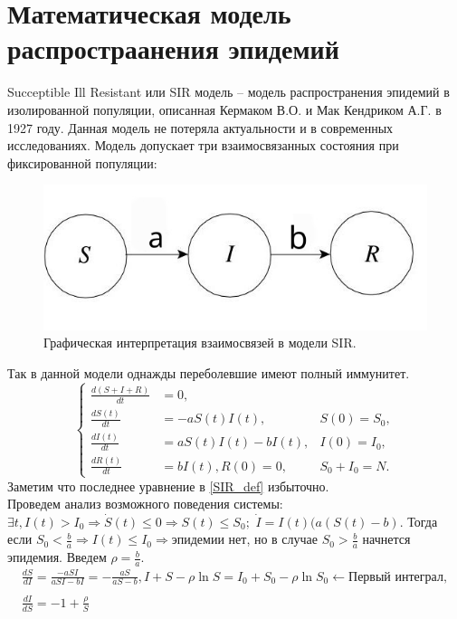 \section{Математическая модель распростраанения эпидемий}
Succeptible Ill Resistant или SIR модель -- модель распространения эпидемий в изолированной популяции, описанная Кермаком В.О. и Мак Кендриком А.Г. в 1927 году. Данная модель не потеряла актуальности и в современных исследованиях.
Модель допускает три взаимосвязанных состояния при фиксированной популяции: 
\begin{figure}[H]
	\begin{center}
		\includegraphics[width=0.7\linewidth]{ch11/SIR_model.jpg}
	\end{center}
	\caption{Графическая интерпретация взаимосвязей в модели SIR.}
\end{figure}
Так в данной модели однажды переболевшие имеют полный иммунитет.
\begin{equation}
	\left\lbrace 
	\begin{array}{lll}
		\frac{d(S+I+R)}{dt} &= 0,&\\
		\frac{dS(t)}{dt} &= -aS(t)I(t),& S(0)=S_0,\\
		\frac{dI(t)}{dt} &= aS(t)I(t)-bI(t),& I(0)=I_0,\\
		\frac{dR(t)}{dt} &= bI(t), R(0)=0,& S_0+I_0=N.
	\end{array}
	\right.
	\label{SIR_def}
\end{equation}
Заметим что последнее уравнение в \ref{SIR_def} избыточно. \\
Проведем анализ возможного поведения системы:
$\exists t, I(t)>I_0 \Rightarrow \dot{S}(t) \leqslant 0 \Rightarrow S(t) \leqslant S_0;$ $\dot{I} = I(t)(a(S(t) - b)$. Тогда если $S_0 < \frac{b}{a} \Rightarrow I(t) \leqslant I_0 \Rightarrow \text{эпидемии нет}$, но в случае $S_0 > \frac{b}{a}$ начнется эпидемия. Введем $\rho = \frac{b}{a}$.\\
\begin{equation*}
	\begin{array}{l}
	\frac{dS}{dI} = \frac{-aSI}{aSI-bI}=-\frac{aS}{aS-b}, I+S-\rho \ln{S}=I_0+S_0- \rho \ln{S_0} \leftarrow \text{Первый интеграл},\\
	\\
	\frac{dI}{dS} = -1 + \frac{\rho}{S}	
	\end{array}
\end{equation*}
